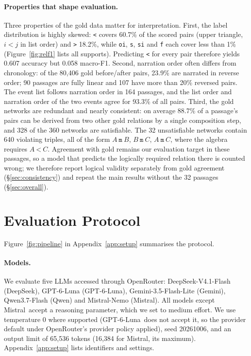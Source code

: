 \documentclass[11pt]{article}
\newcommand{\rel}[1]{\texttt{#1}}
\newcommand{\Ds}{DeepSeek}
\newcommand{\Gp}{GPT-6-Luna}
\newcommand{\Gm}{Gemini}
\newcommand{\Qw}{Qwen}
\newcommand{\Ms}{Mistral}
\begin{document}
\paragraph{Properties that shape evaluation.}
Three properties of the gold data matter for interpretation. First, the label distribution is highly skewed: \rel{<} covers 60.7\% of the scored pairs (upper triangle, $i<j$ in list order) and \rel{>} 18.2\%, while \rel{oi}, \rel{s}, \rel{si} and \rel{f} each cover less than 1\% (Figure~\ref{fig:relf1} lists all supports). Predicting \rel{<} for every pair therefore yields 0.607 accuracy but 0.058 macro-F1. Second, narration order often differs from chronology: of the 80,406 gold before/after pairs, 23.9\% are narrated in reverse order; 90 passages are fully linear and 107 have more than 20\% reversed pairs. The event list follows narration order in 164 passages, and the list order and narration order of the two events agree for 93.3\% of all pairs. Third, the gold networks are redundant and nearly consistent: on average 88.7\% of a passage's pairs can be derived from two other gold relations by a single composition step, and 328 of the 360 networks are satisfiable. The 32 unsatisfiable networks contain 640 violating triples, all of the form $A\ \rel{m}\ B$, $B\ \rel{m}\ C$, $A\ \rel{m}\ C$, where the algebra requires $A\ \rel{<}\ C$. Agreement with gold remains our evaluation target in these passages, so a model that predicts the logically required relation there is counted wrong; we therefore report logical validity separately from gold agreement (\S\ref{sec:consistency}) and repeat the main results without the 32 passages (\S\ref{sec:overall}).

\section{Evaluation Protocol}
\label{sec:protocol}

Figure~\ref{fig:pipeline} in Appendix~\ref{app:setup} summarises the protocol.

\paragraph{Models.}
We evaluate five LLMs accessed through OpenRouter: DeepSeek-V4.1-Flash (\Ds), GPT-6-Luna (\Gp), Gemini-3.5-Flash-Lite (\Gm), Qwen3.7-Flash (\Qw) and Mistral-Nemo (\Ms). All models except \Ms\ accept a reasoning parameter, which we set to medium effort. We use temperature 0 where supported (\Gp\ does not accept it, so the provider default under OpenRouter's provider policy applied), seed 20261006, and an output limit of 65,536 tokens (16,384 for \Ms, its maximum). Appendix~\ref{app:setup} lists identifiers and settings.
\end{document}
